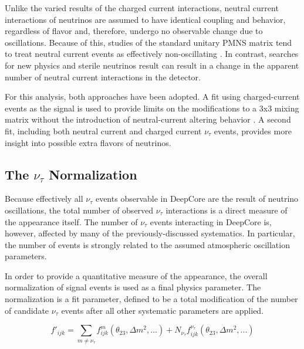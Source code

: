 Unlike the varied results of the charged current interactions, neutral current interactions of neutrinos are assumed to have identical coupling and behavior, regardless of flavor and, therefore, undergo no observable change due to oscillations.
Because of this, studies of the standard unitary PMNS matrix tend to treat neutral current events as effectively non-oscillating .
In contrast, searches for new physics and sterile neutrinos result can result in a change in the apparent number of neutral current interactions in the detector.

For this analysis, both approaches have been adopted.
A fit using charged-current events as the signal is used to provide limits on the modifications to a 3x3 mixing matrix without the introduction of neutral-current altering behavior .
A second fit, including both neutral current and charged current $\nu_\tau$ events, provides more insight into possible extra flavors of neutrinos.

\label{subsec:norm_tau}
\subsection{The $\nu_{\tau}$ Normalization}
Because effectively all $\nu_\tau$ events observable in DeepCore are the result of neutrino oscillations, the total number of observed $\nu_\tau$ interactions is a direct measure of the appearance itself.
The number of $\nu_\tau$ events interacting in DeepCore is, however, affected by many of the previously-discussed systematics.
In particular, the number of events is strongly related to the assumed atmospheric oscillation parameters.

In order to provide a quantitative measure of the appearance, the overall normalization of signal events is used as a final physics parameter. 
The normalization is a fit parameter, defined to be a total modification of the number of candidate $\nu_\tau$ events after all other systematic parameters are applied.

\label{eqn:norm_tau_definition}
\begin{equation}
	f'_{ijk} = \sum_{m\neq\nu_\tau} f^m_{ijk}\left(\theta_{23}, \Delta m^2, ...\right) + N_{\nu_\tau} f^{\nu_\tau}_{ijk}\left(\theta_{23}, \Delta m^2, ...\right) 
\end{equation}


